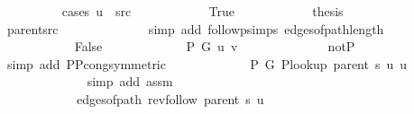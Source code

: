 \begin{isabellebody}
\ \ \ \ \ \ \ \ \isamarkupfalse%
\ {\isacharparenleft}{\kern0pt}cases\ {\isachardoublequoteopen}u\ {\isacharequal}{\kern0pt}\ src{\isachardoublequoteclose}{\isacharparenright}{\kern0pt}\isanewline
\ \ \ \ \ \ \ \ \ \ \isamarkupfalse%
\ True\isanewline
\ \ \ \ \ \ \ \ \ \ \isamarkupfalse%
\ {\isacharquery}{\kern0pt}thesis\isanewline
\ \ \ \ \ \ \ \ \ \ \ \ \isamarkupfalse%
\ parent{\isacharunderscore}{\kern0pt}src\isanewline
\ \ \ \ \ \ \ \ \ \ \ \ \isamarkupfalse%
\ {\isacharparenleft}{\kern0pt}simp\ add{\isacharcolon}{\kern0pt}\ follow{\isacharunderscore}{\kern0pt}psimps\ edges{\isacharunderscore}{\kern0pt}of{\isacharunderscore}{\kern0pt}path{\isacharunderscore}{\kern0pt}length{\isacharparenright}{\kern0pt}\isanewline
\ \ \ \ \ \ \ \ \isamarkupfalse%
\isanewline
\ \ \ \ \ \ \ \ \ \ \isamarkupfalse%
\ False\isanewline
\ \ \ \ \ \ \ \ \ \ \isamarkupfalse%
\ {\isachardoublequoteopen}{\isasymnot}\ P\ G{}\ u\ v{\isachardoublequoteclose}\isanewline
\ \ \ \ \ \ \ \ \ \ \ \ \isamarkupfalse%
\ not{\isacharunderscore}{\kern0pt}P{\isacharprime}{\kern0pt}{\isacharprime}{\kern0pt}\isanewline
\ \ \ \ \ \ \ \ \ \ \ \ \isamarkupfalse%
\ {\isacharparenleft}{\kern0pt}simp\ add{\isacharcolon}{\kern0pt}\ P{\isacharunderscore}{\kern0pt}P{\isacharprime}{\kern0pt}{\isacharprime}{\kern0pt}{\isacharunderscore}{\kern0pt}cong{\isacharbrackleft}{\kern0pt}symmetric{\isacharbrackright}{\kern0pt}{\isacharparenright}{\kern0pt}\isanewline
\ \ \ \ \ \ \ \ \ \ \isamarkupfalse%
\ {\isachardoublequoteopen}{\isasymnot}\ P{\isacharprime}{\kern0pt}\ G{}\ {\isacharparenleft}{\kern0pt}P{\isacharunderscore}{\kern0pt}lookup\ {\isacharparenleft}{\kern0pt}parent\ s{\isacharparenright}{\kern0pt}\ u{\isacharparenright}{\kern0pt}\ u{\isachardoublequoteclose}\isanewline
\ \ \ \ \ \ \ \ \ \ \ \ \isamarkupfalse%
\ {\isacharparenleft}{\kern0pt}simp\ add{\isacharcolon}{\kern0pt}\ assm{\isacharparenright}{\kern0pt}\isanewline
\ \ \ \ \ \ \ \ \ \ \isamarkupfalse%
\isanewline
\ \ \ \ \ \ \ \ \ \ \ \ {\isachardoublequoteopen}edges{\isacharunderscore}{\kern0pt}of{\isacharunderscore}{\kern0pt}path\ {\isacharparenleft}{\kern0pt}rev{\isacharunderscore}{\kern0pt}follow\ {\isacharparenleft}{\kern0pt}parent\ s{\isacharparenright}{\kern0pt}\ u{\isacharparenright}{\kern0pt}\ {\isasymnoteq}\ {\isacharbrackleft}{\kern0pt}{\isacharbrackright}{\kern0pt}{\isachardoublequoteclose}\isanewline

\end{isabellebody}

